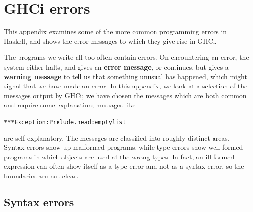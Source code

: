 

\chapter{GHCi errors}
\label{hugsErrors}

This appendix examines some of the more common programming errors in Haskell,
and shows the error messages to which they give rise in GHCi.

The programs we write all too often contain errors. On encountering an error,
the system either halts, and gives an \textbf{error message\/}, or
continues, but gives a \textbf{warning message\/} to tell us that something
unusual has happened, which might signal that
we have made an error. In this
appendix, we look at a selection of the messages output by GHCi;
we have
chosen the messages which are both common and require some explanation;
messages like
\begin{alltt}
*** Exception: Prelude.head: empty list
\end{alltt}
are self-explanatory. The messages are classified into roughly distinct
areas. Syntax errors show up malformed programs, while type errors show
well-formed programs in which objects are used at the wrong types. In fact,
an ill-formed expression can often show itself as a type error and not as a
syntax error, so the boundaries are not clear.

\section*{Syntax errors}

